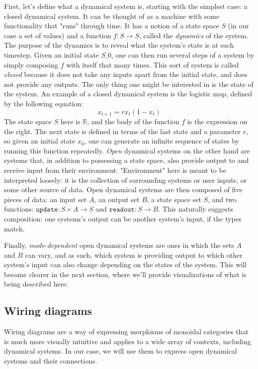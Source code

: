 First, let's define what a dynamical system is, starting with the simplest case: a closed dynamical system. It can be thought of as a machine with some functionality that "runs" through time. It has a notion of a state space $S$ (in our case a set of values) and a function $f : S \rightarrow S$, called the \textit{dynamics} of the system. The purpose of the dynamics is to reveal what the system's state is at each timestep. Given an initial state $S\_0$, one can then run several steps of a system by simply composing $f$ with itself that many times. This sort of system is called \textit{closed} because it does not take any inputs apart from the initial state, and does not provide any outputs. The only thing one might be interested in is the state of the system. An example of a closed dynamical system is the logistic map, defined by the following equation:
$$
x_{t+1} = rx_t(1 - x_t)
$$
The state space $S$ here is $\mathbb{R}$, and the body of the function $f$ is the expression on the right. The next state is defined in terms of the last state and a parameter $r$, so given an initial state $x_0$, one can generate an infinite sequence of states by running this function repeatedly.
\textit{Open} dynamical systems on the other hand are systems that, in addition to possessing a state space, also provide output to and receive input from their environment. "Environment" here is meant to be interpreted loosely: it is the collection of surrounding systems or user inputs, or some other source of data. Open dynamical systems are then composed of five pieces of data: an input set $A$, an output set $B$, a state space set $S$, and two functions: $\texttt{update} : S \times A \rightarrow S$ and $\texttt{readout} : S \rightarrow B$.  This naturally suggests composition: one systems's output can be another system's input, if the types match.

Finally, \textit{mode-dependent} open dynamical systems are ones in which the sets $A$ and $B$ can vary, and as such, which system is providing output to which other system's input can also change depending on the states of the system. This will become clearer in the next section, where we'll provide visualizations of what is being described here.

\subsection{Wiring diagrams}

Wiring diagrams are a way of expressing morphisms of monoidal categories that is much more visually intuitive and applies to a wide array of contexts, including dynamical systems\cite{operadwd}. In our case, we will use them to express open dynamical systems and their connections.

